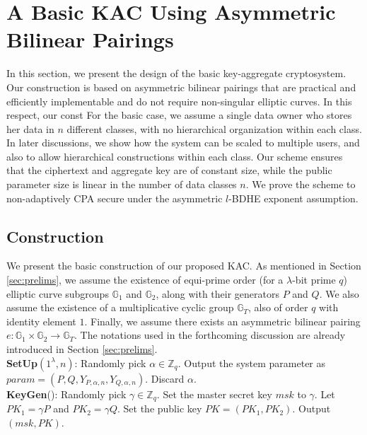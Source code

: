 \section{A Basic KAC Using Asymmetric Bilinear Pairings}
\label{sec:proposal}


In this section, we present the design of the basic key-aggregate cryptosystem. Our construction is based on asymmetric bilinear pairings that are practical and efficiently implementable and do not require non-singular elliptic curves. In this respect, our const For the basic case, we assume a single data owner who stores her data in $n$ different classes, with no hierarchical organization within each class. In later discussions, we show how the system can be scaled to multiple users, and also to allow hierarchical constructions within each class. Our scheme ensures that the ciphertext and aggregate key are of constant size, while the public parameter size is linear in the number of data classes $n$. We prove the scheme to non-adaptively CPA secure under the asymmetric $l$-BDHE exponent assumption.

\subsection{Construction}
\label{subsec:construction1}

We present the basic construction of our proposed KAC. As mentioned in Section \ref{sec:prelims}, we assume the existence of equi-prime order (for a $\lambda$-bit prime $q$) elliptic curve subgroups $\mathbb{G}_1$ and $\mathbb{G}_2$, along with their generators $P$ and $Q$. We also assume the existence of a multiplicative cyclic group $\mathbb{G}_{T}$, also of order $q$ with identity element $1$. Finally, we assume there exists an asymmetric bilinear pairing ${e}:\mathbb{G}_1 \times \mathbb{G}_2\longrightarrow\mathbb{G}_T$. The notations used in the forthcoming discussion are already introduced in Section \ref{sec:prelims}.\\

 \noindent \textbf{SetUp}$(1^{\lambda},n)$: Randomly pick $\alpha \in \mathbb{Z}_q$. Output the system parameter as $param = (P,Q,Y_{P,\alpha,n},Y_{Q,\alpha,n})$. Discard $\alpha$. \\
 
 \noindent \textbf{KeyGen}(): Randomly pick $\gamma\in \mathbb{Z}_q$. Set the master secret key $msk$ to $\gamma$. Let $PK_1=\gamma P$ and $PK_2=\gamma Q$. Set the public key $PK=(PK_1,PK_2)$. Output $(msk,PK)$.\\
 
